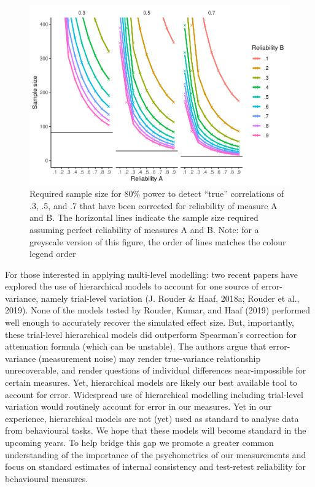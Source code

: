 \documentclass[english,,man,floatsintext]{apa6}
\begin{document}
\begin{figure}
\centering
\includegraphics{Parsons-Kruijt-Fox---reporting-reliability_files/figure-latex/figuretwo-1.pdf}
\caption{\label{fig:figuretwo}Required sample size for 80\% power to detect \enquote{true} correlations of .3, .5, and .7 that have been corrected for reliability of measure A and B. The horizontal lines indicate the sample size required assuming perfect reliability of measures A and B. Note: for a greyscale version of this figure, the order of lines matches the colour legend order}
\end{figure}

For those interested in applying multi-level modelling: two recent papers have explored the use of hierarchical models to account for one source of error-variance, namely trial-level variation (J. Rouder \& Haaf, 2018a; Rouder et al., 2019). None of the models tested by Rouder, Kumar, and Haaf (2019) performed well enough to accurately recover the simulated effect size. But, importantly, these trial-level hierarchical models did outperform Spearman's correction for attenuation formula (which can be unstable). The authors argue that error-variance (measurement noise) may render true-variance relationship unrecoverable, and render questions of individual differences near-impossible for certain measures. Yet, hierarchical models are likely our best available tool to account for error. Widespread use of hierarchical modelling including trial-level variation would routinely account for error in our measures. Yet in our experience, hierarchical models are not (yet) used as standard to analyse data from behavioural tasks. We hope that these models will become standard in the upcoming years. To help bridge this gap we promote a greater common understanding of the importance of the psychometrics of our measurements and focus on standard estimates of internal consistency and test-retest reliability for behavioural measures.
\end{document}
